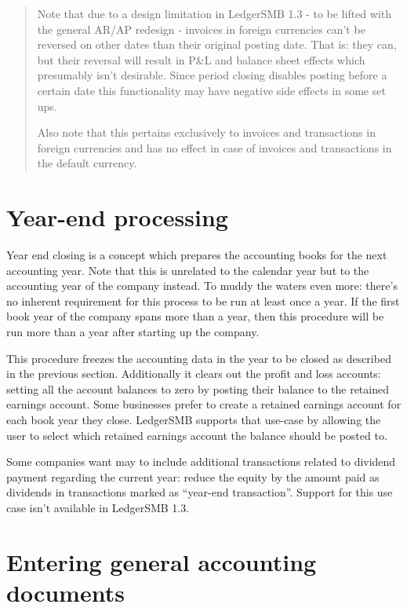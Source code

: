 \begin{quotation}
Note that due to a design limitation in LedgerSMB 1.3 - to be lifted with the
general AR/AP redesign - invoices in foreign currencies can't be reversed on
other dates than their original posting date. That is: they can, but their
reversal will result in P\&L and balance sheet effects which presumably isn't
desirable. Since period closing disables posting before a certain date this
functionality may have negative side effects in some set ups.

Also note that this pertains exclusively to invoices and transactions in foreign
currencies and has no effect in case of invoices and transactions in the default
currency.
\end{quotation}

\section{Year-end processing}
\label{sec:YearEndProcessing}

Year end closing is a concept which prepares the accounting books for the next
accounting year. Note that this is unrelated to the calendar year but to the
accounting year of the company instead. To muddy the waters even more: there's
no inherent requirement for this process to be run at least once a year. If the
first book year of the company spans more than a year, then this procedure will
be run more than a year after starting up the company.

This procedure freezes the accounting data in the year to be closed as described
in the previous section. Additionally it clears out the profit and loss accounts:
setting all the account
balances to zero by posting their balance to the retained earnings account. Some
businesses prefer to create a retained earnings account for each book year they
close. LedgerSMB supports that use-case by allowing the user to select which
retained earnings account the balance should be posted to.

Some companies want may to include additional transactions related to dividend
payment regarding the current year: reduce the equity by the amount paid as
dividends in transactions marked as ``year-end transaction''. Support
for this use case isn't available in LedgerSMB 1.3.


\section{Entering general accounting documents}

